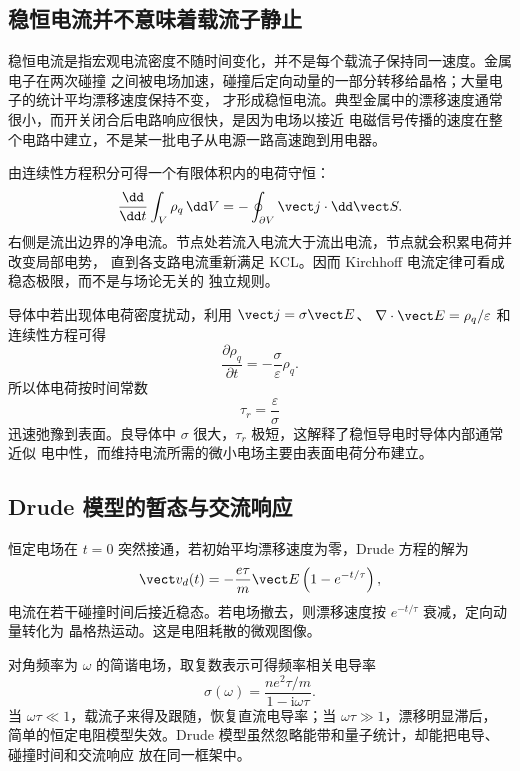 \subsection*{稳恒电流并不意味着载流子静止}

稳恒电流是指宏观电流密度不随时间变化，并不是每个载流子保持同一速度。金属电子在两次碰撞
之间被电场加速，碰撞后定向动量的一部分转移给晶格；大量电子的统计平均漂移速度保持不变，
才形成稳恒电流。典型金属中的漂移速度通常很小，而开关闭合后电路响应很快，是因为电场以接近
电磁信号传播的速度在整个电路中建立，不是某一批电子从电源一路高速跑到用电器。

由连续性方程积分可得一个有限体积内的电荷守恒：
\begin{equation}
 \frac{\dd}{\dd t}\int_V\rho_q\,\dd V
 =-\oint_{\partial V}\vect j\cdot\dd\vect S.
\end{equation}
右侧是流出边界的净电流。节点处若流入电流大于流出电流，节点就会积累电荷并改变局部电势，
直到各支路电流重新满足 KCL。因而 Kirchhoff 电流定律可看成稳态极限，而不是与场论无关的
独立规则。

导体中若出现体电荷密度扰动，利用 $\vect j=\sigma\vect E$、
$\nabla\cdot\vect E=\rho_q/\varepsilon$ 和连续性方程可得
\begin{equation}
 \frac{\partial\rho_q}{\partial t}=-\frac\sigma\varepsilon\rho_q.
\end{equation}
所以体电荷按时间常数
\begin{equation}
 \tau_r=\frac\varepsilon\sigma
\end{equation}
迅速弛豫到表面。良导体中 $\sigma$ 很大，$\tau_r$ 极短，这解释了稳恒导电时导体内部通常近似
电中性，而维持电流所需的微小电场主要由表面电荷分布建立。

\subsection*{Drude 模型的暂态与交流响应}

恒定电场在 $t=0$ 突然接通，若初始平均漂移速度为零，Drude 方程的解为
\begin{equation}
 \vect v_d(t)=-\frac{e\tau}{m}\vect E
 \left(1-e^{-t/\tau}\right),
\end{equation}
电流在若干碰撞时间后接近稳态。若电场撤去，则漂移速度按 $e^{-t/\tau}$ 衰减，定向动量转化为
晶格热运动。这是电阻耗散的微观图像。

对角频率为 $\omega$ 的简谐电场，取复数表示可得频率相关电导率
\begin{equation}
 \boxed{\sigma(\omega)=\frac{ne^2\tau/m}{1-\mathrm i\omega\tau}}.
\end{equation}
当 $\omega\tau\ll1$，载流子来得及跟随，恢复直流电导率；当 $\omega\tau\gg1$，漂移明显滞后，
简单的恒定电阻模型失效。Drude 模型虽然忽略能带和量子统计，却能把电导、碰撞时间和交流响应
放在同一框架中。


